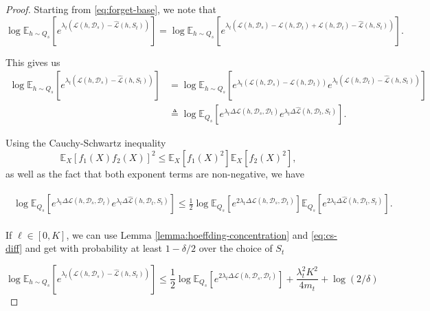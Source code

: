 \documentclass{article}
\theoremstyle{plain}
\theoremstyle{definition}
\theoremstyle{remark}
\begin{document}
\begin{proof}
    Starting from \eqref{eq:forget-base}, we note that
    $$\log\mathbb{E}_{h\sim Q_{s}}\left [e^{\lambda_t(\mathcal{L}(h,\mathcal{D}_s)-\hat{\mathcal{L}}(h,S_t))} \right ] = \log\mathbb{E}_{h\sim Q_{s}}\left [e^{\lambda_t(\mathcal{L}(h,\mathcal{D}_s)-\mathcal{L}(h,\mathcal{D}_t)+\mathcal{L}(h,\mathcal{D}_t)-\hat{\mathcal{L}}(h,S_t))} \right ].$$

    This gives us 
\begin{align*}
\log\mathbb{E}_{h\sim Q_{s}}\left [e^{\lambda_t(\mathcal{L}(h,\mathcal{D}_s)-\hat{\mathcal{L}}(h,S_t))} \right] &= \log\mathbb{E}_{h\sim Q_{s}}\left [e^{\lambda_t(\mathcal{L}(h,\mathcal{D}_s)-\mathcal{L}(h,\mathcal{D}_t))}e^{\lambda_t(\mathcal{L}(h,\mathcal{D}_t)-\hat{\mathcal{L}}(h,S_t))} \right ]\\
&\triangleq \log\mathbb{E}_{Q_{s}}\left [e^{\lambda_t\Delta\mathcal{L}(h,\mathcal{D}_s, \mathcal{D}_t)}e^{\lambda_t\Delta\hat{\mathcal{L}}(h,\mathcal{D}_t, S_t)} \right ].
\end{align*}

Using the Cauchy-Schwartz inequality $$\mathbb{E}_{X}\left [f_1(X)f_2(X)\right ]^2\leq \mathbb{E}_{X}\left [f_1(X)^2\right ]\mathbb{E}_{X}\left [f_2(X)^2\right ],$$
as well as the fact that both exponent terms are non-negative, we have

\begin{align} \label{eq:cs-diff}
\begin{split}
\log\mathbb{E}_{Q_{s}}\left [e^{\lambda_t\Delta\mathcal{L}(h,\mathcal{D}_s, \mathcal{D}_t)}e^{\lambda_t\Delta\hat{\mathcal{L}}(h,\mathcal{D}_t, S_t)} \right ]\leq \frac{1}{2}\log\mathbb{E}_{Q_{s}}\left [e^{2\lambda_t\Delta\mathcal{L}(h,\mathcal{D}_s, \mathcal{D}_t)}\right ]\mathbb{E}_{Q_{s}}\left [e^{2\lambda_t\Delta\hat{\mathcal{L}}(h,\mathcal{D}_t, S_t)} \right ].
\end{split}
\end{align}

If $\ell\in [0,K]$, we can use Lemma \ref{lemma:hoeffding-concentration} and \eqref{eq:cs-diff} and get with probability at least $1-\delta/2$ over the choice of $S_t$

$$\log\mathbb{E}_{h\sim Q_{s}}\left [e^{\lambda_t(\mathcal{L}(h,\mathcal{D}_s)-\hat{\mathcal{L}}(h,S_t))} \right ]\leq \frac{1}{2}\log\mathbb{E}_{Q_{s}}\left [e^{2\lambda_t\Delta\mathcal{L}(h,\mathcal{D}_s, \mathcal{D}_t)}\right ]+\frac{\lambda_t^2K^2}{4m_t}+\log(2/\delta)$$

\end{proof}
\end{document}
